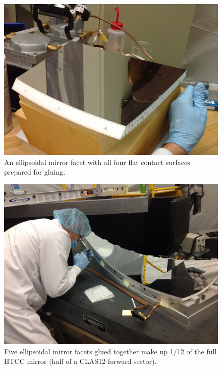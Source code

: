 \begin{figure}[ht]
    \centering
    \includegraphics[width=1.0\linewidth]{images/Picture2.png}
    \caption{An ellipsoidal mirror facet with all four flat contact surfaces prepared for gluing.}
    \label{fig:facet}
\end{figure}
\begin{figure}[ht]
    \centering
    \includegraphics[trim={20cm 15cm 0 10cm },clip,width=\linewidth]{images/Picture3.JPG}
    \caption{Five ellipsoidal mirror facets glued together make up 1/12 of the full HTCC mirror (half of a CLAS12 forward sector).}
    \label{fig:Picture3}
\end{figure}

